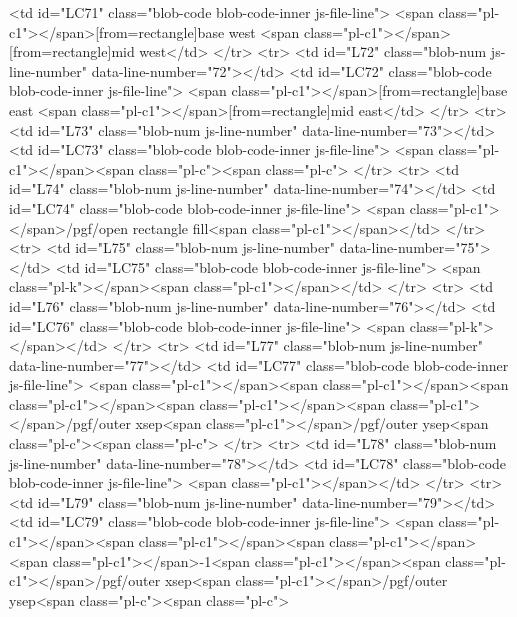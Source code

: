 {        <td id="LC71" class="blob-code blob-code-inner js-file-line">  <span class="pl-c1">\inheritanchor</span>[from=rectangle]{base west} <span class="pl-c1">\inheritanchor</span>[from=rectangle]{mid west}</td>
      </tr>
      <tr>
        <td id="L72" class="blob-num js-line-number" data-line-number="72"></td>
        <td id="LC72" class="blob-code blob-code-inner js-file-line">  <span class="pl-c1">\inheritanchor</span>[from=rectangle]{base east} <span class="pl-c1">\inheritanchor</span>[from=rectangle]{mid east}</td>
      </tr>
      <tr>
        <td id="L73" class="blob-num js-line-number" data-line-number="73"></td>
        <td id="LC73" class="blob-code blob-code-inner js-file-line">  <span class="pl-c1">\behindbackgroundpath</span>{<span class="pl-c"><span class="pl-c">%
      </tr>
      <tr>
        <td id="L74" class="blob-num js-line-number" data-line-number="74"></td>
        <td id="LC74" class="blob-code blob-code-inner js-file-line">    <span class="pl-c1">\pgfkeysgetvalue</span>{/pgf/open rectangle fill}<span class="pl-c1">\pgf@temp</span></td>
      </tr>
      <tr>
        <td id="L75" class="blob-num js-line-number" data-line-number="75"></td>
        <td id="LC75" class="blob-code blob-code-inner js-file-line">    <span class="pl-k">\ifx</span><span class="pl-c1">\pgf@temp\pgfutil@empty</span></td>
      </tr>
      <tr>
        <td id="L76" class="blob-num js-line-number" data-line-number="76"></td>
        <td id="LC76" class="blob-code blob-code-inner js-file-line">    <span class="pl-k">\else</span></td>
      </tr>
      <tr>
        <td id="L77" class="blob-num js-line-number" data-line-number="77"></td>
        <td id="LC77" class="blob-code blob-code-inner js-file-line">      <span class="pl-c1">\pgfextract@process\SW</span>{<span class="pl-c1">\pgfpointadd</span>{<span class="pl-c1">\southwest</span>}{<span class="pl-c1">\pgfpoint</span>{<span class="pl-c1">\pgfkeysvalueof</span>{/pgf/outer xsep}}{<span class="pl-c1">\pgfkeysvalueof</span>{/pgf/outer ysep}}}}<span class="pl-c"><span class="pl-c">%
      </tr>
      <tr>
        <td id="L78" class="blob-num js-line-number" data-line-number="78"></td>
        <td id="LC78" class="blob-code blob-code-inner js-file-line">      <span class="pl-c1">\pgf@xa\pgf@x\pgf@ya\pgf@y</span></td>
      </tr>
      <tr>
        <td id="L79" class="blob-num js-line-number" data-line-number="79"></td>
        <td id="LC79" class="blob-code blob-code-inner js-file-line">      <span class="pl-c1">\pgfextract@process\NE</span>{<span class="pl-c1">\pgfpointadd</span>{<span class="pl-c1">\northeast</span>}{<span class="pl-c1">\pgfpointscale</span>{-1}{<span class="pl-c1">\pgfpoint</span>{<span class="pl-c1">\pgfkeysvalueof</span>{/pgf/outer xsep}}{<span class="pl-c1">\pgfkeysvalueof</span>{/pgf/outer ysep}}}}}<span class="pl-c"><span class="pl-c">%
}}
